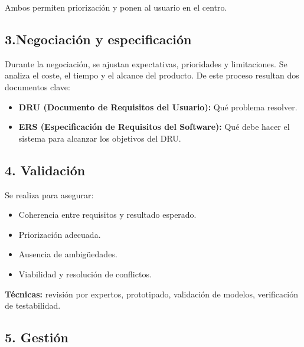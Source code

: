     Ambos permiten priorización y ponen al usuario en el centro.

    \subsection*{3.Negociación y especificación}\label{subsec:3.negociacion-y-especificacion}


    Durante la negociación, se ajustan expectativas, prioridades y limitaciones.
    Se analiza el coste, el tiempo y el alcance del producto.
    De este proceso resultan dos documentos clave:


    \begin{itemize}

        \item \textbf{DRU (Documento de Requisitos del Usuario):} Qué problema resolver.

        \item \textbf{ERS (Especificación de Requisitos del Software):} Qué debe hacer el sistema para alcanzar los objetivos del DRU\@.

    \end{itemize}


    \subsection*{4. Validación}\label{subsec:4.-validacion}


    Se realiza para asegurar:

    \begin{itemize}

        \item Coherencia entre requisitos y resultado esperado.

        \item Priorización adecuada.

        \item Ausencia de ambigüedades.

        \item Viabilidad y resolución de conflictos.

    \end{itemize}


    \textbf{Técnicas:} revisión por expertos, prototipado, validación de modelos, verificación de testabilidad.


    \subsection*{5. Gestión}


